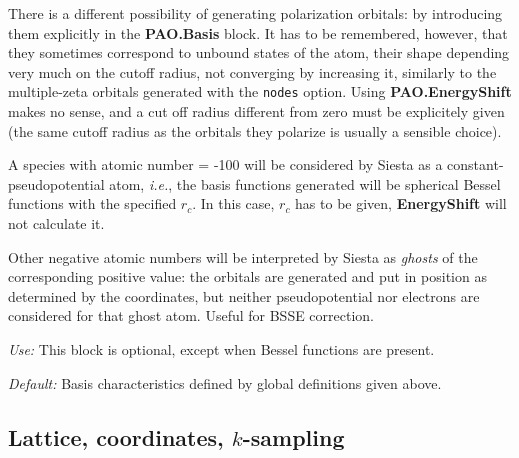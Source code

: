 \documentclass[11pt]{article}
\begin{document}
\begin{description}
There is a different possibility of generating polarization orbitals:
by introducing them explicitly in the {\bf PAO.Basis} block.
It has to be remembered, however, that they sometimes correspond to 
unbound states of the atom, their shape depending very much on the
cutoff radius, not converging by increasing it, similarly to the
multiple-zeta orbitals generated with the {\tt nodes} option. 
Using {\bf PAO.EnergyShift} makes no sense, and a cut off 
radius different from zero must be explicitely given (the same cutoff radius
as the orbitals they polarize is usually a sensible choice).

A species with atomic number = -100 will be considered by {\sc Siesta} as
a constant-pseudopotential atom, {\it i.e.}, the basis functions
generated will be spherical Bessel functions
with the specified $r_c$. In this case, $r_c$ has to be given, 
{\bf EnergyShift} will not calculate it.

Other negative atomic numbers will be interpreted by {\sc Siesta} as 
{\it ghosts} 
of the corresponding positive value: the orbitals
are generated and put in position as determined by the coordinates,
but neither pseudopotential nor electrons are considered for that
ghost atom. Useful for BSSE correction.

{\it Use:} This block is optional, except when Bessel functions are present. 

{\it Default:} Basis characteristics defined by global definitions given
above.

\end{description}


\vspace{5pt}
\subsection{Lattice, coordinates, $k$-sampling}
\end{document}
